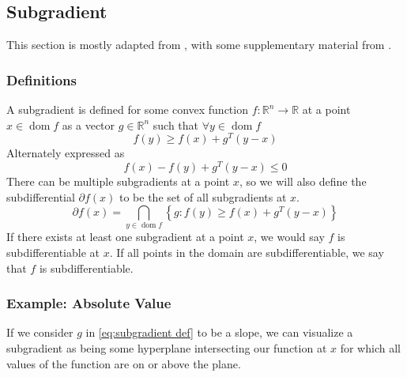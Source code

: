 \documentclass[conference]{IEEEtran}
\DeclareMathOperator{\dom}{dom}
\begin{document}
\subsection{Subgradient}\label{sec:math subgrad}
This section is mostly adapted from \cite{boydvandenberghesubgradient}, with some supplementary material from \cite{boydparksubgradients}.
\subsubsection{Definitions}
A subgradient is defined for some convex function \(f: \mathbb{R}^n \rightarrow \mathbb{R}\) at a point \(x \in \dom f\) as a vector \(g \in \mathbb{R}^n\) such that \(\forall y \in \dom f\)
\begin{equation}\label{eq:subgradient def}
f(y) \geq f(x) + g^T (y-x) 
\end{equation}
Alternately expressed as
\begin{equation}\label{eq:modified subgradient def}
    f(x) - f(y) + g^T(y-x) \leq 0
\end{equation}
There can be multiple subgradients at a point \(x\), so we will also define the subdifferential \(\partial f(x)\) to be the set of all subgradients at \(x\).
\begin{equation}\label{eq:math subdifferential}
\partial f(x) = \bigcap_{y \in \dom f} \left\{ g : f(y) \geq f(x) + g^T (y-x)\right\}
\end{equation}
If there exists at least one subgradient at a point \(x\), we would say \(f\) is subdifferentiable at \(x\). If all points in the domain are subdifferentiable, we say that \(f\) is subdifferentiable.

\subsubsection{Example: Absolute Value}
If we consider \(g\) in \eqref{eq:subgradient def} to be a slope, we can visualize a subgradient as being some hyperplane intersecting our function at \(x\) for which all values of the function are on or above the plane. 
\end{document}
